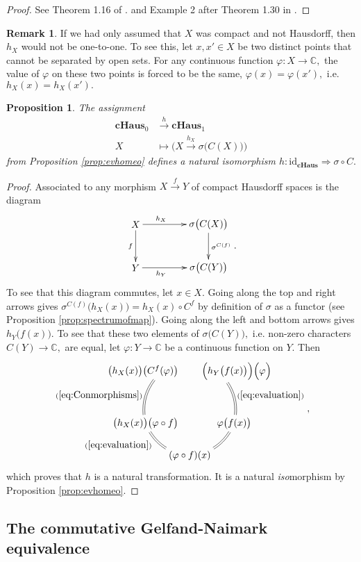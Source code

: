 \documentclass[12pt]{article}
\edef\t{\pgfmathresult}%
\theoremstyle{theorem}
\newtheorem{proposition}[equation]{Proposition}
\theoremstyle{definition}
\newtheorem{remark}[equation]{Remark}
\numberwithin{equation}{section}
\let\s=\sigma \let\t=\tau \let\u=\upsilon \let\f=\phi \let\c=\chi
\let\C=\Chi \let\W=\Omega
\def\vf{\varphi}
\newcommand{\be}{\begin{equation}}
\newcommand{\ee}{\end{equation}}
\newcommand{\bn}{\begin{proposition}}
\newcommand{\en}{\end{proposition}}
\newcommand{\bprf}{\begin{proof}}
\newcommand{\eprf}{\end{proof}}
\newcommand{\br}{\begin{remark}}
\newcommand{\er}{\end{remark}}
\newcommand{\<}{\langle}
\renewcommand{\>}{\rangle}
\newcommand{\id}{\mathrm{id}}
\def\C{{{\mathbb C}}}
\newcommand{\cH}{\mathbf{cHaus}}
\begin{document}
\bprf
See Theorem 1.16 of \cite{Fo94}.
and Example 2 after
Theorem 1.30 in \cite{Fo94}.
\eprf

\br
\label{rmk:whyHausdorff}
If we had only assumed that $X$ was compact and not Hausdorff, then 
$h_{X}$ would not be one-to-one. To see this, let $x,x'\in X$ be two distinct
points that cannot be separated by open sets. For any continuous function
$\vf:X\to\C,$ the value of $\vf$ on these two points is forced to be the same, 
$\vf(x)=\vf(x'),$ i.e. $h_{X}(x)=h_{X}(x').$
\er

\bn
\label{prop:hnaturaltransform}
The assignment
\be
\begin{split}
\cH_{0}&\xrightarrow{h}\cH_{1}\\
X&\mapsto\Big(X
\xrightarrow{h_{X}}\s\big(C(X)\big)\Big)
\end{split}
\ee
from Proposition \ref{prop:evhomeo}
defines a natural isomorphism 
$h:\id_{\cH}\Rightarrow\s\circ C.$ 
\en

\bprf
Associated to any morphism $X\xrightarrow{f}Y$
of compact Hausdorff spaces is the diagram
\be
\xy0;/r.25pc/:
(-12.5,7.5)*+{X}="X";
(-12.5,-7.5)*+{Y}="Y";
(12.5,7.5)*+{\s\big(C(X)\big)}="scX";
(12.5,-7.5)*+{\s\big(C(Y)\big)}="scY";
{\ar"X";"Y"_{f}};
{\ar"scX";"scY"^{\s^{C(f)}}};
{\ar"X";"scX"^(0.35){h_{X}}};
{\ar"Y";"scY"_(0.35){h_{Y}}};
\endxy
.
\ee
To see that this diagram commutes, let $x\in X.$ 
Going along the top and right arrows gives
$
\s^{C(f)}\big(h_{X}(x)\big)
=h_{X}(x)\circ C^{f}
$
by definition of $\s$ as a functor 
(see Proposition \ref{prop:spectrumofmap}).
Going along the left and bottom arrows gives
$
h_{Y}\big(f(x)\big).
$
To see that these two elements of
$\s\big(C(Y)\big),$ i.e.
non-zero characters $C(Y)\to\C,$ are equal,
let $\varphi:Y\to\C$ be a continuous function on $Y.$
Then 
\be
\xy0;/r.20pc/:
(11.7557,16.1803)*+{\qquad\qquad
\Big(h_{Y}\big(f(x)\big)\Big)\Big(\varphi\Big)}="1";
(19.0211,-6.1803)*+{\varphi\big(f(x)\big)}="2";
(0,-20)*+{(\varphi\circ f)(x)}="3";
(-19.0211,-6.1803)*+{
\big(h_{X}(x)\big)\big(\varphi\circ f\big)}="4";
(-11.7557,16.1803)*+{
\big(h_{X}(x)\big)\big(C^{f}(\varphi)\big)
\qquad\qquad}="5";
{\ar@{=}@/^0.7pc/"1";"2"^(0.55){(\ref{eq:evaluation})}};
{\ar@{=}@/^0.7pc/"2";"3"};
{\ar@{=}@/^0.7pc/"3";"4"^(0.70){(\ref{eq:evaluation})}};
{\ar@{=}@/^0.7pc/"4";"5"^(0.45){(\ref{eq:Conmorphisms})}};
\endxy
,
\ee
which proves that $h$ is a 
natural transformation. It is a natural 
\emph{iso}morphism by Proposition 
\ref{prop:evhomeo}.
\eprf


\subsection{The commutative Gelfand-Naimark equivalence}
\end{document}
